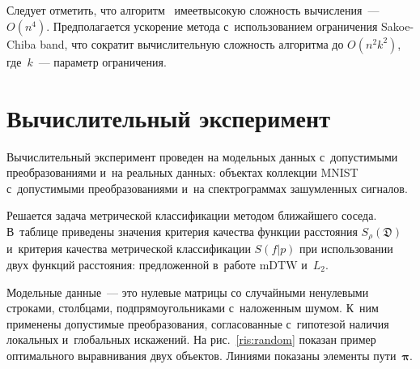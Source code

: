 \begin{multicols}{2}
\begin{figure*} %
\vspace*{1pt}
    \begin{center}  
  \mbox{%
 \epsfxsize=161.412mm 
 }
\end{center}
\vspace*{-12.5pt}
\vspace*{1pt}
    \begin{center}  
  \mbox{%
 \epsfxsize=163mm 
 }
\end{center}
\vspace*{-12.5pt}
\end{figure*}


Следует отметить, что алгоритм~\cite{15} имеет\linebreak высокую сложность 
вычисления~--- $O(n^4)$. Предполагается ускорение метода 
с~использованием ограниче\-ния Sakoe-Chiba band, что сократит 
вычислительную сложность алгоритма до $O(n^2k^2)$, где~$k$~--- 
параметр ограничения.


\section{Вычислительный эксперимент}

Вычислительный эксперимент проведен на модельных данных с~допустимыми 
преобразованиями и~на реальных данных: объектах коллекции MNIST с~допустимыми 
преобразованиями и~на спектрограммах зашумленных сигналов.





Решается задача метрической классификации методом ближайшего соседа. В~таблице 
приведены значения критерия качества функции расстояния 
$S_{\rho}(\mathfrak{D})$ и~критерия качества метрической классификации $S(f|p)$ 
при использовании двух функций расстояния: предложенной в~работе $\mathrm{mDTW}$ 
и~$L_2$.

Модельные данные~--- это нулевые матрицы со случайными ненулевыми 
строками, столбцами, подпрямоугольниками с~наложенным шумом. 
К~ним применены допустимые преобразования, согласованные с~гипотезой 
наличия локальных и~глобальных искажений. На рис.~\ref{ris:random} 
показан пример оптимального выравнивания двух объектов. 
Линиями показаны элементы пути~$\boldsymbol{\pi}$.


\end{multicols}
